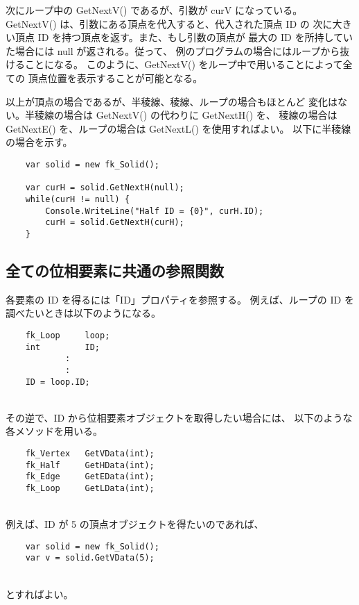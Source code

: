 次にループ中の GetNextV() であるが、引数が curV になっている。
GetNextV() は、引数にある頂点を代入すると、代入された頂点 ID の
次に大きい頂点 ID を持つ頂点を返す。また、もし引数の頂点が
最大の ID を所持していた場合には null が返される。従って、
例のプログラムの場合にはループから抜けることになる。
このように、GetNextV() をループ中で用いることによって全ての
頂点位置を表示することが可能となる。

以上が頂点の場合であるが、半稜線、稜線、ループの場合もほとんど
変化はない。半稜線の場合は GetNextV() の代わりに GetNextH() を、
稜線の場合は GetNextE() を、ループの場合は GetNextL() を使用すればよい。
以下に半稜線の場合を示す。
\\
\begin{breakbox}
\begin{verbatim}
    var solid = new fk_Solid();

    var curH = solid.GetNextH(null);
    while(curH != null) {
        Console.WriteLine("Half ID = {0}", curH.ID);
        curH = solid.GetNextH(curH);
    }
\end{verbatim}
\end{breakbox}
\subsection{全ての位相要素に共通の参照関数}
各要素の ID を得るには「ID」プロパティを参照する。
例えば、ループの ID を調べたいときは以下のようになる。
\\
\begin{screen}
\begin{verbatim}
    fk_Loop     loop;
    int         ID;
            :
            :
    ID = loop.ID;
\end{verbatim}
\end{screen}
~ \\
その逆で、ID から位相要素オブジェクトを取得したい場合には、
以下のような各メソッドを用いる。
\\
\begin{screen}
\begin{verbatim}
    fk_Vertex   GetVData(int);
    fk_Half     GetHData(int);
    fk_Edge     GetEData(int);
    fk_Loop     GetLData(int);
\end{verbatim}
\end{screen}
~ \\
例えば、ID が 5 の頂点オブジェクトを得たいのであれば、
\\
\begin{screen}
\begin{verbatim}
    var solid = new fk_Solid();
    var v = solid.GetVData(5);
\end{verbatim}
\end{screen}
~ \\
とすればよい。
